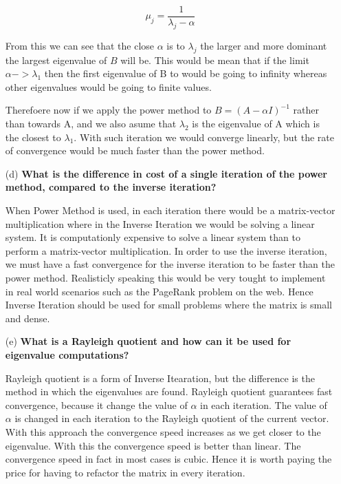 \documentclass[unicode,11pt,a4paper,oneside,numbers=endperiod,openany]{scrartcl}
\begin{document}
\begin{enumerate}
          $$ \mu_j = \frac{1}{\lambda_j - \alpha} $$

          From this we can see that the close $\alpha$ is to $\lambda_j$ the larger and more dominant the largest eigenvalue of $B$ will be. This would be mean that if the limit $\alpha -> \lambda_1$ then the first eigenvalue of B to would be going to infinity whereas other eigenvalues would be going to finite values.

          Therefoere now if we apply the power method to $ B = (A - \alpha I)^{-1}$ rather than towards A, and we also asume that $ \lambda_2$ is the eigenvalue of A which is the closest to $\lambda_1$. With such iteration we would converge linearly, but the rate of convergence would be much faster than the power method.

    \item[(d)] \textbf{What is the difference in cost of a single iteration of the power method, compared to the inverse iteration?}

          When Power Method is used, in each iteration there would be a matrix-vector multiplication where in the Inverse Iteration we would be solving a linear system. It is computationly expensive to solve a linear system than to perform a matrix-vector multiplication. In order to use the inverse iteration, we must have a fast convergence for the inverse iteration to be faster than the power method. Realisticly speaking this would be very tought to implement in real world scenarios such as the PageRank problem on the web. Hence Inverse Iteration should be used for small problems where the matrix is small and dense.

    \item[(e)] \textbf{What is a Rayleigh quotient and how can it be used for eigenvalue computations?}

          Rayleigh quotient is a form of Inverse Itearation, but the difference is the method in which the eigenvalues are found. Rayleigh quotient guarantees fast convergence, because it change the value of $\alpha$ in each iteration. The value of $\alpha$ is changed in each iteration to the Rayleigh quotient of the current vector. With this approach the convergence speed increases as we get closer to the eigenvalue. With this the convergence speed is better than linear. The convergence speed in fact in most cases is cubic. Hence it is worth paying the price for having to refactor the matrix in every iteration.
\end{enumerate}
\end{document}
